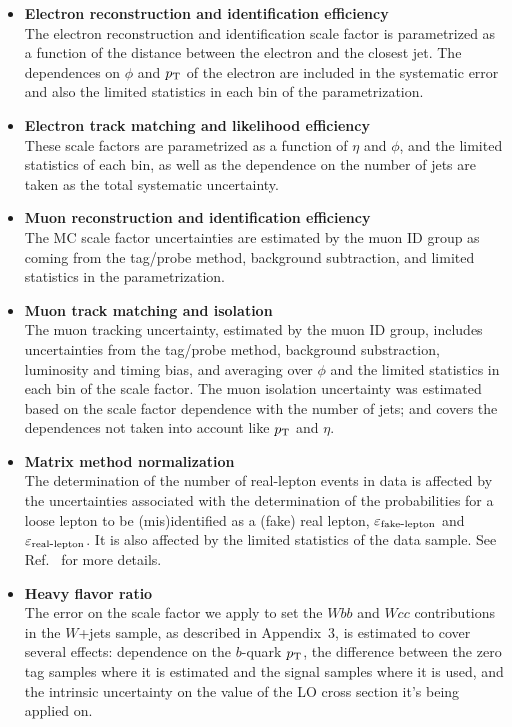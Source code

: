 \begin{itemize}
\item {\bf Electron reconstruction and identification efficiency} \\
The electron reconstruction and identification scale factor is
parametrized as a function of the distance between the electron and
the closest jet. The dependences on $\phi$ and $\mbox{$p_{\rm T}$}$ of the electron
are included in the systematic error and also the limited statistics
in each bin of the parametrization.

\item {\bf Electron track matching and likelihood efficiency} \\
These scale factors are parametrized as a function of $\eta$ and
$\phi$, and the limited statistics of each bin, as well as the
dependence on the number of jets are taken as the total systematic
uncertainty.

\item {\bf Muon reconstruction and identification efficiency} \\
The MC scale factor uncertainties are estimated by the muon ID group
as coming from the tag/probe method, background subtraction, and
limited statistics in the parametrization.

\item {\bf Muon track matching and isolation} \\
The muon tracking uncertainty, estimated by the muon ID group,
includes uncertainties from the tag/probe method, background
substraction, luminosity and timing bias, and averaging over $\phi$
and the limited statistics in each bin of the scale factor. The muon
isolation uncertainty was estimated based on the scale factor
dependence with the number of jets; and covers the dependences not
taken into account like $\mbox{$p_{\rm T}$}$ and $\eta$.

\item {\bf Matrix method normalization} \\
The determination of the number of real-lepton events in data is
affected by the uncertainties associated with the determination of the
probabilities for a loose lepton to be (mis)identified as a (fake)
real lepton, $\varepsilon_{\rm fake{\mbox{\small -}}{\rm lepton}}$ and
$\varepsilon_{\rm real{\mbox{\small -}}{\rm lepton}}$. It is also
affected by the limited statistics of the data sample. See
Ref.~\cite{matrix-method} for more details.

\item {\bf Heavy flavor ratio} \\
The error on the scale factor we apply to set the $Wbb$ and $Wcc$
contributions in the $W$+jets sample, as described in Appendix~3, is
estimated to cover several effects: dependence on the $b$-quark $\mbox{$p_{\rm T}$}$,
the difference between the zero tag samples where it is estimated and the
signal samples where it is used, and the intrinsic uncertainty on the value of
the LO cross section it's being applied on. 


\end{itemize}
